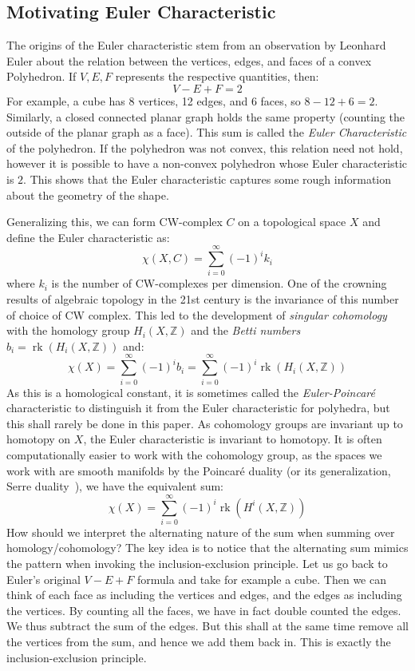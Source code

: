 \documentclass{ut-thesis}
\newcommand{\Z}{{\mathbb{Z}}}
\newcommand{\rk}{{\operatorname{rk}}}
\begin{document}
\subsection{Motivating Euler Characteristic}

The origins of the Euler characteristic stem from an observation by Leonhard Euler about the relation between
the vertices, edges, and faces of a convex Polyhedron. If $V,E,F$ represents the respective quantities, then:
\[
  V-E+F = 2
\]
For example, a cube has 8 vertices, 12 edges, and 6 faces, so $8-12+6 = 2$. Similarly, a closed connected
planar graph holds the same property (counting the outside of the planar graph as a face). This sum is called
the \emph{Euler Characteristic} of the polyhedron. If the polyhedron was not convex, this relation need not
hold, however it is possible to have a non-convex polyhedron whose Euler characteristic is $2$. This shows
that the Euler characteristic captures some rough information about the geometry of the shape.


Generalizing this, we can form CW-complex $C$ on a topological space $X$ and define the Euler characteristic
as:
\[
  \chi(X, C) = \sum_{i=0}^\infty (-1)^ik_i
\]
where $k_i$ is the number of CW-complexes per dimension. One of the crowning results of algebraic topology in
the 21st century is the invariance of this number of choice of CW complex. This led to the development of
\emph{singular cohomology} with the homology group $H_i(X, \Z)$ and the \emph{Betti numbers} $b_i = \rk(H_i(X,
\Z))$ and:
\[
  \chi(X) = \sum_{i=0}^\infty (-1)^ib_i = \sum_{i=0}^\infty (-1)^i\rk(H_i(X, \Z))
\]
As this is a homological constant, it is sometimes called the \emph{Euler-Poincar\'e} characteristic to
distinguish it from the Euler characteristic for polyhedra, but this shall rarely be done in this paper. As
cohomology groups are invariant up to homotopy on $X$, the Euler characteristic is invariant to homotopy. It
is often computationally easier to work with the cohomology group, as the spaces we work with are smooth
manifolds by the Poincar\'e duality \cite[section~4.3]{NateAlgTop} (or its generalization, Serre
duality~\cite[section~5.3]{NateAlgGeo}), we have the equivalent sum:
\[
  \chi(X) =  \sum_{i=0}^\infty (-1)^i\rk(H^i(X, \Z))
\]
How should we interpret the alternating nature of the sum when summing over homology/cohomology? The key idea
is to notice that the alternating sum mimics the pattern when invoking the inclusion-exclusion principle.
Let us go back to Euler's original $V-E+F$ formula and take for example a cube. Then we can think of
each face as including the vertices and edges, and the edges as including the vertices. By counting all the
faces, we have in fact double counted the edges. We thus subtract the sum of the edges. But this shall at the
same time remove all the vertices from the sum, and hence we add them back in. This is exactly the
inclusion-exclusion principle.
\end{document}
